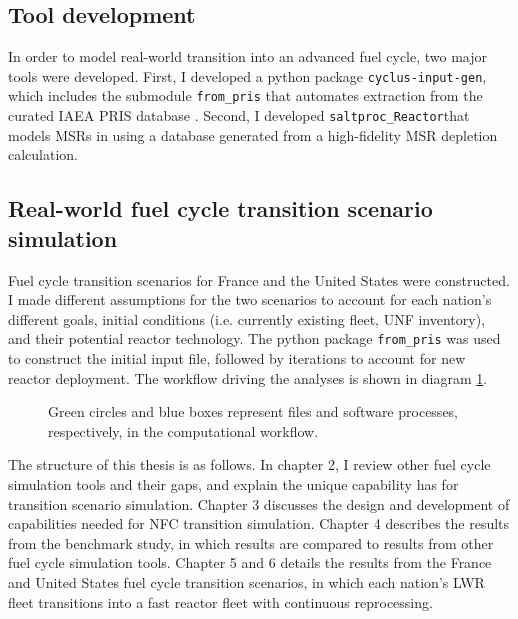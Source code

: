 \subsection{Tool development}
In order to model real-world transition into an advanced
fuel cycle, two major tools were developed. First, I developed a python package \texttt{cyclus-input-gen},
which includes the submodule \texttt{from\_pris}
that automates extraction from the curated \gls{IAEA} \gls{PRIS} database
\cite{iaea_nuclear_2018}. Second, I developed \texttt{saltproc\_Reactor}that models \glspl{MSR}
in \Cyclus using a database generated from a high-fidelity \gls{MSR} depletion calculation.

\subsection{Real-world fuel cycle transition scenario simulation}
Fuel cycle transition scenarios for France and the United States were constructed.
I made different assumptions for the two scenarios to account for each nation's different goals,
initial conditions (i.e. currently existing fleet, \gls{UNF} inventory), and their potential reactor
technology. The python package \texttt{from\_pris} was used to construct the initial \Cyclus input file,
followed by iterations to account for new reactor deployment. The workflow driving the analyses is shown in diagram \ref{diag:workflow}.


\begin{figure}
        \centering
{}
\caption{Green circles and blue boxes represent files and software 
processes, respectively, in the computational workflow.}
\label{diag:workflow}
\end{figure}


The structure of this thesis is as follows. In chapter 2, I review other fuel cycle simulation
tools and their gaps, and explain the unique capability \Cyclus
has for transition scenario simulation.
Chapter 3 discusses the design and
development of capabilities needed for \gls{NFC} transition simulation.
Chapter 4 describes the results from the benchmark study, in which \Cyclus results are compared
to results from other fuel cycle simulation tools.
Chapter 5 and 6 details the results from the France and United States fuel cycle
transition scenarios, in which each nation's \gls{LWR} fleet transitions into
a fast reactor fleet with continuous reprocessing.
